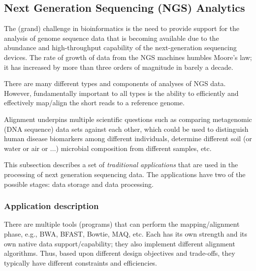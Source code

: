 \subsection{Next Generation Sequencing (NGS) Analytics \label{bioSilvia}}

The (grand) challenge in bioinformatics is the need to provide support
for the analysis of genome sequence data that is becoming available
due to the abundance and high-throughput capability of the
next-generation sequencing devices. The rate of growth of data from
the NGS machines humbles Moore's law; it has increased by more than
three orders of magnitude in barely a decade.

There are many different types and components of analyses of NGS data.
However, fundamentally important to all types is the ability to
efficiently and effectively map/align the short reads to a reference
genome.

Alignment underpins multiple scientific questions such as comparing
metagenomic (DNA sequence) data sets against each other, which could
be used to distinguish human disease biomarkers among different
individuals, determine different soil (or water or air or ...)
microbial composition from different samples, etc.

This subsection describes a set of {\em traditional applications} that
are used in the processing of next generation sequencing data.  The
applications have two of the possible stages: data storage and data
processing.

\subsubsection*{Application description}


There are multiple tools (programs) that can perform the mapping/alignment
phase, e.g., BWA, BFAST, Bowtie, MAQ, etc. Each has its own strength and
its own native data support/capability; they also implement
different alignment algorithms. Thus, based upon different design
objectives and trade-offs, they typically have different constraints
and efficiencies.

